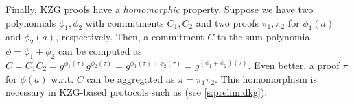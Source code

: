 Finally, KZG proofs have a \textit{homomorphic} property.
Suppose we have two polynomials $\phi_1, \phi_2$ with commitments $C_1,C_2$ and two proofs $\pi_1,\pi_2$ for $\phi_1(a)$ and $\phi_2(a)$, respectively.
Then, a commitment $C$ to the sum polynomial $\phi=\phi_1 + \phi_2$ can be computed as $C=C_1 C_2=g^{\phi_1(\tau)} g^{\phi_2(\tau)} = g^{\phi_1(\tau) + {\phi_2(\tau)}} = g^{(\phi_1 +\phi_2)(\tau)}$.
Even better, a proof $\pi$ for $\phi(a)$ w.r.t. $C$ can be aggregated as $\pi = \pi_1 \pi_2$.
This homomorphism is necessary in KZG-based protocols such as \ejfdkg (see \cref{s:prelim:dkg}).

%
%
%
%

